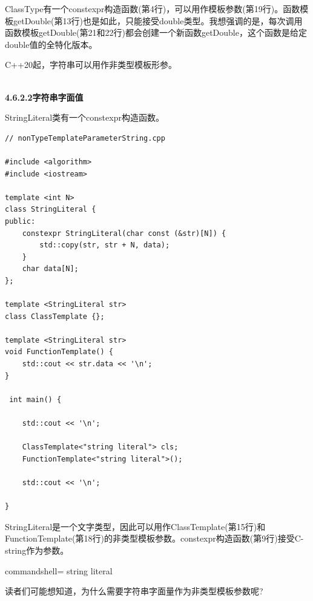 ClassType有一个constexpr构造函数(第4行)，可以用作模板参数(第19行)。函数模板getDouble(第13行)也是如此，只能接受double类型。我想强调的是，每次调用函数模板getDouble(第21和22行)都会创建一个新函数getDouble，这个函数是给定double值的全特化版本。

C++20起，字符串可以用作非类型模板形参。

\hspace*{\fill} \\ %
\noindent
\textbf{4.6.2.2\hspace{0.2cm}字符串字面值}

StringLiteral类有一个constexpr构造函数。

\begin{lstlisting}[style=styleCXX]
// nonTypeTemplateParameterString.cpp

#include <algorithm>
#include <iostream>

template <int N>
class StringLiteral {
public:
	constexpr StringLiteral(char const (&str)[N]) {
		std::copy(str, str + N, data);
	}
	char data[N];
};

template <StringLiteral str>
class ClassTemplate {};

template <StringLiteral str>
void FunctionTemplate() {
	std::cout << str.data << '\n';
}

 int main() {
	
	std::cout << '\n';
	
	ClassTemplate<"string literal"> cls;
	FunctionTemplate<"string literal">();
	
	std::cout << '\n';

}
\end{lstlisting}

StringLiteral是一个文字类型，因此可以用作ClassTemplate(第15行)和FunctionTemplate(第18行)的非类型模板参数。constexpr构造函数(第9行)接受C-string作为参数。

\begin{tcblisting}{commandshell={}}
string literal
\end{tcblisting}

读者们可能想知道，为什么需要字符串字面量作为非类型模板参数呢?

